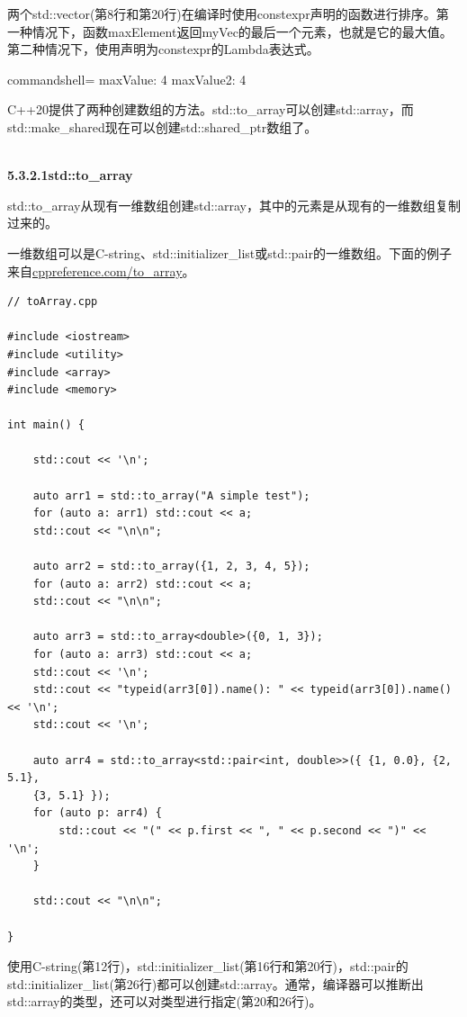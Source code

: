 两个std::vector(第8行和第20行)在编译时使用constexpr声明的函数进行排序。第一种情况下，函数maxElement返回myVec的最后一个元素，也就是它的最大值。第二种情况下，使用声明为constexpr的Lambda表达式。

\begin{tcblisting}{commandshell={}}
maxValue: 4
maxValue2: 4
\end{tcblisting}


C++20提供了两种创建数组的方法。std::to\_array可以创建std::array，而std::make\_shared现在可以创建std::shared\_ptr数组了。

\hspace*{\fill} \\ %
\noindent
\textbf{5.3.2.1\hspace{0.2cm}std::to\_array}

std::to\_array从现有一维数组创建std::array，其中的元素是从现有的一维数组复制过来的。

一维数组可以是C-string、std::initializer\_list或std::pair的一维数组。下面的例子来自\href{https://en.cppreference.com/w/cpp/container/array/to_array}{cppreference.com/to\_array}。

\begin{lstlisting}[style=styleCXX]
// toArray.cpp

#include <iostream>
#include <utility>
#include <array>
#include <memory>

int main() {

	std::cout << '\n';
	
	auto arr1 = std::to_array("A simple test");
	for (auto a: arr1) std::cout << a;
	std::cout << "\n\n";
	
	auto arr2 = std::to_array({1, 2, 3, 4, 5});
	for (auto a: arr2) std::cout << a;
	std::cout << "\n\n";
	
	auto arr3 = std::to_array<double>({0, 1, 3});
	for (auto a: arr3) std::cout << a;
	std::cout << '\n';
	std::cout << "typeid(arr3[0]).name(): " << typeid(arr3[0]).name() << '\n';
	std::cout << '\n';
	
	auto arr4 = std::to_array<std::pair<int, double>>({ {1, 0.0}, {2, 5.1},
	{3, 5.1} });
	for (auto p: arr4) {
		std::cout << "(" << p.first << ", " << p.second << ")" << '\n';
	}
	
	std::cout << "\n\n";

}
\end{lstlisting}

使用C-string(第12行)，std::initializer\_list(第16行和第20行)，std::pair的std::initializer\_list(第26行)都可以创建std::array。通常，编译器可以推断出std::array的类型，还可以对类型进行指定(第20和26行)。

